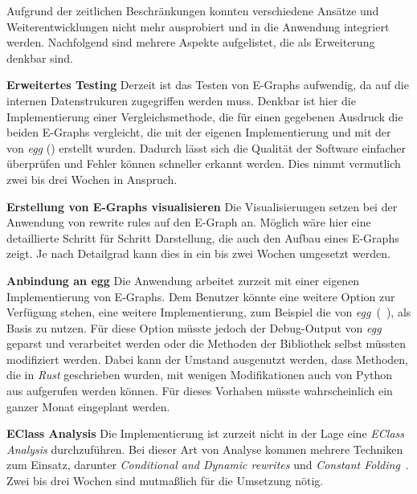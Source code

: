 Aufgrund der zeitlichen Beschränkungen konnten verschiedene Ansätze und Weiterentwicklungen nicht mehr ausprobiert und in die Anwendung integriert werden.
Nachfolgend sind mehrere Aspekte aufgelistet, die als Erweiterung denkbar sind. 

\textbf{Erweitertes Testing} Derzeit ist das Testen von E-Graphs aufwendig, da auf die internen Datenstrukuren zugegriffen werden muss.
Denkbar ist hier die Implementierung einer Vergleichsmethode, die für einen gegebenen Ausdruck die beiden E-Graphs vergleicht,
die mit der eigenen Implementierung und mit der von \textit{egg} (\cite{2021-egg}) erstellt wurden. 
Dadurch lässt sich die Qualität der Software einfacher überprüfen und Fehler können schneller erkannt werden.
Dies nimmt vermutlich zwei bis drei Wochen in Anspruch.

\textbf{Erstellung von E-Graphs visualisieren} Die Visualisierungen setzen bei der Anwendung von rewrite rules auf den E-Graph an.
Möglich wäre hier eine detaillierte Schritt für Schritt Darstellung, die auch den Aufbau eines E-Graphs zeigt. 
Je nach Detailgrad kann dies in ein bis zwei Wochen umgesetzt werden.

\textbf{Anbindung an egg} Die Anwendung arbeitet zurzeit mit einer eigenen Implementierung von E-Graphs. Dem Benutzer könnte eine weitere Option zur Verfügung stehen, eine weitere
Implementierung, zum Beispiel die von \textit{egg}~(~\cite{2021-egg}), als Basis zu nutzen.
Für diese Option müsste jedoch der Debug-Output von \textit{egg} geparst und verarbeitet werden oder die Methoden der Bibliothek selbst müssten modifiziert werden.
Dabei kann der Umstand ausgenutzt werden, dass Methoden, die in \textit{Rust} geschrieben wurden, mit wenigen Modifikationen auch von Python aus aufgerufen werden können.
Für dieses Vorhaben müsste wahrscheinlich ein ganzer Monat eingeplant werden.

\textbf{EClass Analysis}
Die Implementierung ist zurzeit nicht in der Lage eine \textit{EClass Analysis} durchzuführen. Bei dieser Art von Analyse kommen mehrere Techniken zum Einsatz, darunter
\textit{Conditional and Dynamic rewrites} und \textit{Constant Folding}~\cite{2021-egg}. Zwei bis drei Wochen sind mutmaßlich für die Umsetzung nötig.
